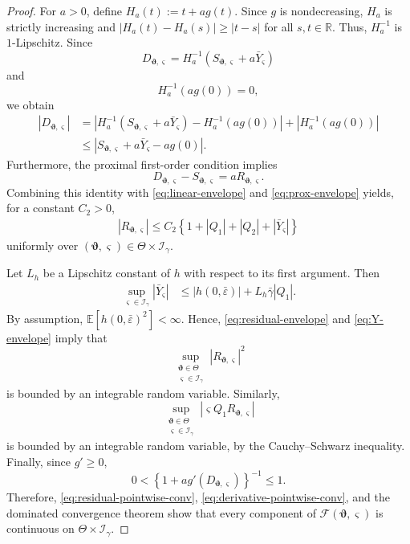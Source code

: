 \documentclass[12pt,reqno]{amsart}
\begin{document}
{\begin{proof}
For $a>0$, define $H_a(t):=t+a g(t).$
Since $g$ is nondecreasing, $H_a$ is strictly increasing and $|H_a(t)-H_a(s)|\ge |t-s|$ for all $s,t\in\mathbb{R}.$
Thus, $H_a^{-1}$ is $1$-Lipschitz. Since
\[
D_{\bm\vartheta,\varsigma}
=
H_a^{-1}\left(S_{\bm\vartheta,\varsigma}+a\bar Y_{\varsigma}\right)
\]
and
\[
H_a^{-1}(a g(0))=0,
\]
we obtain
\begin{align}
|D_{\bm\vartheta,\varsigma}|
&=|H_a^{-1}\left(S_{\bm\vartheta,\varsigma}+a\bar Y_{\varsigma}\right)-H_a^{-1}\left(ag(0)\right)|+|H_a^{-1}\left(ag(0)\right)| \\
&\le
\left|
S_{\bm\vartheta,\varsigma}+a\bar Y_{\varsigma}-a g(0)
\right|.
\label{eq:prox-envelope}
\end{align}
Furthermore, the proximal first-order condition implies
\[
D_{\bm\vartheta,\varsigma}-S_{\bm\vartheta,\varsigma}
=aR_{\bm\vartheta,\varsigma}.
\]
Combining this identity with \eqref{eq:linear-envelope} and
\eqref{eq:prox-envelope} yields, for a constant $C_2>0$,
\begin{align}
|R_{\bm\vartheta,\varsigma}|
\le
C_2
\left\{
1+|Q_1|+|Q_2|+|\bar Y_{\varsigma}|
\right\}
\label{eq:residual-envelope}
\end{align}
uniformly over
$(\bm\vartheta,\varsigma)
\in\Theta\times\mathcal I_\gamma$.

Let $L_h$ be a Lipschitz constant of $h$ with respect to its first
argument. Then
\begin{align}
\sup_{\varsigma\in\mathcal I_\gamma}
|\bar Y_{\varsigma}|
&\le
|h(0,\bar\varepsilon)|
+
L_h\bar\gamma |Q_1|.
\label{eq:Y-envelope}
\end{align}
By assumption, $\mathbb{E}\left[
h(0,\bar\varepsilon)^2
\right]<\infty.$
Hence, \eqref{eq:residual-envelope} and \eqref{eq:Y-envelope} imply that
\[
\sup_{\substack{
\bm\vartheta\in\Theta\\
\varsigma\in\mathcal I_\gamma
}}
|R_{\bm\vartheta,\varsigma}|^2
\]
is bounded by an integrable random variable. Similarly,
\[
\sup_{\substack{
\bm\vartheta\in\Theta\\
\varsigma\in\mathcal I_\gamma
}}
\left|
\varsigma Q_1R_{\bm\vartheta,\varsigma}
\right|
\]
is bounded by an integrable random variable, by the Cauchy--Schwarz
inequality. Finally, since $g'\ge0$,
\[
0<
\left\{
1+a g'(D_{\bm\vartheta,\varsigma})
\right\}^{-1}
\le1.
\]
Therefore, \eqref{eq:residual-pointwise-conv},
\eqref{eq:derivative-pointwise-conv}, and the dominated convergence theorem
show that every component of
$\mathcal F(\bm\vartheta,\varsigma)$ is continuous on
$\Theta\times\mathcal I_\gamma$.


\end{proof}}
\end{document}
